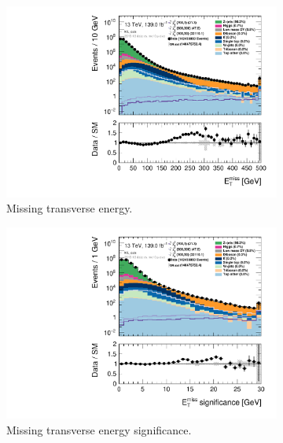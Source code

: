 \begin{figure}[H]
\begin{subfigure}[t!]{0.49\textwidth}
    \end{subfigure}
    \\
    \begin{subfigure}[t!]{0.49\textwidth}
        \includegraphics[width=\textwidth]{Figures/SlepSlep/CutAndCount/ML_cuts/hist1d_met_Et_ML_cuts.pdf}
    \caption{Missing transverse energy.}
    \label{fig:my_label}
    \end{subfigure}
    \begin{subfigure}[t!]{0.49\textwidth}
        \includegraphics[width=\textwidth]{Figures/SlepSlep/CutAndCount/ML_cuts/hist1d_met_Sign_ML_cuts.pdf}
    \caption{Missing transverse energy significance.}
    \label{fig:my_label}
    \end{subfigure}
    \\
    \begin{subfigure}[t!]{0.49\textwidth}

\end{subfigure}
\end{figure}
